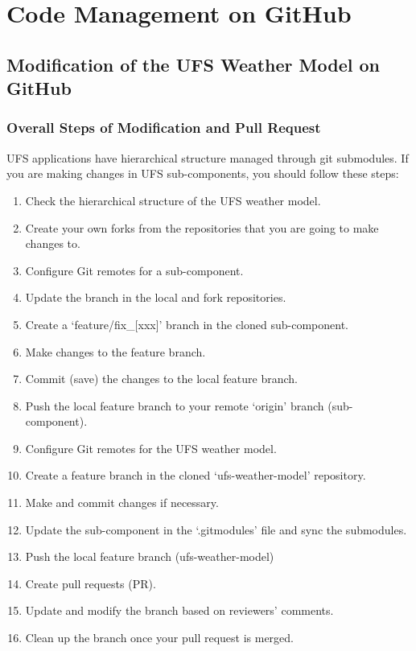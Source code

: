 \documentclass[11pt,fleqn]{report}              %
\begin{document}
\chapter{Code Management on GitHub}                 
\label{chpt:code_manage_github}


\section{Modification of the UFS Weather Model on GitHub}
\label{sec:mod_ufs_github}

\subsection{Overall Steps of Modification and Pull Request}
\label{subsec:mod_ufs_overall}

UFS applications have hierarchical structure managed through git submodules. If you are making changes in UFS sub-components, you should follow these steps:

\begin{enumerate}
\item Check the hierarchical structure of the UFS weather model.
\item Create your own forks from the repositories that you are going to make changes to.
\item Configure Git remotes for a sub-component.
\item Update the branch in the local and fork repositories.
\item Create a `feature/fix\_[xxx]' branch in the cloned sub-component.
\item Make changes to the feature branch.
\item Commit (save) the changes to the local feature branch.
\item Push the local feature branch to your remote `origin' branch (sub-component).
\item Configure Git remotes for the UFS weather model.
\item Create a feature branch in the cloned `ufs-weather-model' repository.
\item Make and commit changes if necessary.
\item Update the sub-component in the `.gitmodules' file and sync the submodules.
\item Push the local feature branch (ufs-weather-model)
\item Create pull requests (PR).
\item Update and modify the branch based on reviewers' comments.
\item Clean up the branch once your pull request is merged.
\end{enumerate}
\end{document}
